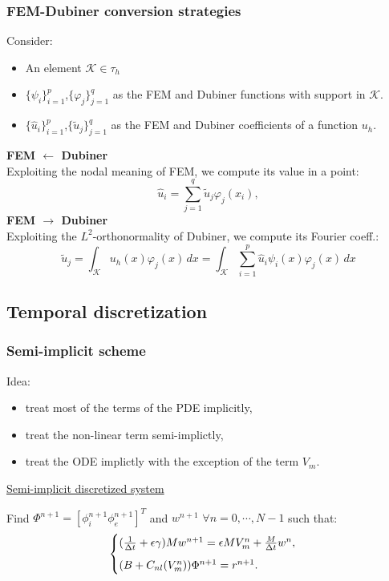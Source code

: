 \documentclass[8pt]{beamer}
\begin{document}
\begin{frame}
\frametitle{FEM-Dubiner conversion strategies}
Consider:
\begin{itemize}
	\small
	\item An element $\mathcal{K}\in \tau_h$
	\item $\{\psi_{i}\}_{i=1}^{p}$,$\{\varphi_{j}\}_{j=1}^{q}$ as the FEM and Dubiner functions with support in $\mathcal{K}$. 
	\item $\{\hat{u}_i\}_{i=1}^p$,$\{\tilde{u}_j\}_{j=1}^q$ as the FEM and Dubiner coefficients of a function $u_h$.
\end{itemize} \vspace{4mm}
\textbf{FEM $\leftarrow$ Dubiner} \\
\small Exploiting the nodal meaning of FEM, we compute its value in a point: \normalsize
\begin{equation*} \label{ref3}
\hat{u}_i = \sum_{j=1}^q \tilde{u}_j\varphi_j(x_i),
\end{equation*}
\textbf{FEM $\rightarrow$ Dubiner} \\
\small Exploiting the $L^2$-orthonormality of Dubiner, we compute its Fourier coeff.: \normalsize
\begin{equation*}\label{ref4}
\tilde{u}_j = \int_\mathcal{K} u_h(x) \varphi_j(x) \,dx = \int_{\mathcal{K}} \sum_{i=1}^p \hat{u}_i\psi_i(x) \varphi_j(x) \,dx
\end{equation*}
\end{frame}


\begin{frame}
\section{Temporal discretization}
\frametitle{Semi-implicit scheme}
Idea:
\begin{itemize}
\item treat most of the terms of the PDE implicitly,
\item treat the non-linear term semi-implictly,
\item treat the ODE implictly with the exception of the term $V_m$.
\end{itemize}
\vspace{3mm}
\begin{center}
\underline{Semi-implicit discretized system}
\end{center}
Find $\Phi^{n+1}=[\phi_i^{n+1} \phi_e^{n+1}]^T$ and $w^{n+1}$ $\forall n=0,\cdots,N-1$ such that:
\begin{equation*}
\begin{cases}
(\frac{1}{\Delta t}+\epsilon \gamma)M w^{n+1}=\epsilon M V_m^n+\frac{M}{\Delta t} w^n, \vspace{2mm} \\
(B+C_{nl}(V_m^n)) \Phi^{n+1}=r^{n+1}.
\end{cases}
\end{equation*} 
\end{frame}
\end{document}
